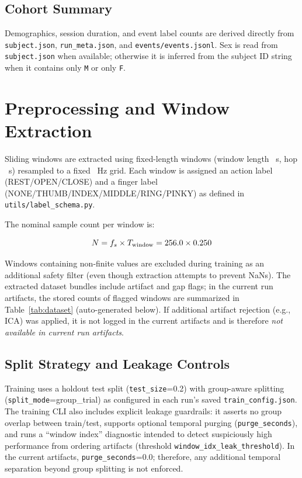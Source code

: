 \documentclass[conference]{IEEEtran}
\newcommand{\NotAvailable}{\textit{not available in current run artifacts}}
\begin{document}
\subsection{Cohort Summary}
Demographics, session duration, and event label counts are derived directly from \texttt{subject.json}, \texttt{run\_meta.json}, and \texttt{events/events.jsonl}. Sex is read from \texttt{subject.json} when available; otherwise it is inferred from the subject ID string when it contains only \texttt{M} or only \texttt{F}.





\section{Preprocessing and Window Extraction}

Sliding windows are extracted using fixed-length windows (window length \WindowSec~s, hop \HopSec~s) resampled to a fixed \TargetFsHz~Hz grid. Each window is assigned an action label (REST/OPEN/CLOSE) and a finger label (NONE/THUMB/INDEX/MIDDLE/RING/PINKY) as defined in \texttt{utils/label\_schema.py}.

The nominal sample count per window is:

\[
N = f_s \times T_{\text{window}} = 256.0 \times 0.250
\]

Windows containing non-finite values are excluded during training as an additional safety filter (even though extraction attempts to prevent NaNs). The extracted dataset bundles include artifact and gap flags; in the current run artifacts, the stored counts of flagged windows are summarized in Table~\ref{tab:dataset} (auto-generated below). If additional artifact rejection (e.g., ICA) was applied, it is not logged in the current artifacts and is therefore \NotAvailable.



\subsection{Split Strategy and Leakage Controls}
Training uses a holdout test split (\texttt{test\_size}=0.2) with group-aware splitting (\texttt{split\_mode}=group\_trial) as configured in each run’s saved \texttt{train\_config.json}. The training CLI also includes explicit leakage guardrails: it asserts no group overlap between train/test, supports optional temporal purging (\texttt{purge\_seconds}), and runs a ``window index'' diagnostic intended to detect suspiciously high performance from ordering artifacts (threshold \texttt{window\_idx\_leak\_threshold}). In the current artifacts, \texttt{purge\_seconds}=0.0; therefore, any additional temporal separation beyond group splitting is not enforced.
\end{document}
